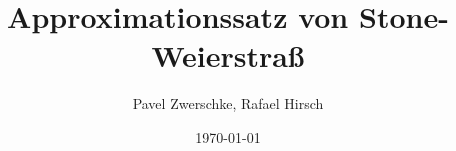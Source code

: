 \documentclass[aspectratio=169]{beamer}
\title[Satz von Stone-Weierstraß]{Approximationssatz von Stone-Weierstraß}
\author{Pavel Zwerschke, Rafael Hirsch}
\date{\today}
\begin{document}
\begin{frame}
    \maketitle
\end{frame}




\end{document}
